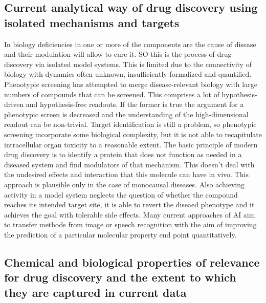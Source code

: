 	\subsection{Current analytical way of drug discovery using isolated mechanisms and targets}
	In biology deficiencies in one or more of the components are the cause of disease and their modulation will allow to cure it.
	SO this is the process of drug discovery via isolated model systems.
	This is limited due to the connectivity of biology with dynamics often unknown, insufficiently formalized and quantified.
	Phenotypic screening has attempted to merge disease-relevant biology with large numbers of compounds that can be screened.
	This comprises a lot of hypothesis-driven and hypothesis-free readouts.
	If the former is true the argument for a phenotypic screen is decreased and the understanding of the high-dimensional readout can be non-trivial.
	Target identification is still a problem, so phenotypic screening incorporate some biological complexity, but it is not able to recapitulate intracellular organ toxicity to a reasonable extent.
	The basic principle of modern drug discovery is to identify a protein that does not function as needed in a diseased system and find modulators of that mechanism.
	This doesn't deal with the undesired effects and interaction that this molecule can have in vivo.
	This approach is plausible only in the case of monocausal diseases.
	Also achieving activity in a model system neglects the question of whether the compound reaches its intended target site, it is able to revert the diseaed phenotype and it achieves the goal with tolerable side effects.
	Many current approaches of AI aim to transfer methods from image or speech recognition with the aim of improving the prediction of a particular molecular property end point quantitatively.

	\subsection{Chemical and biological properties of relevance for drug discovery and the extent to which they are captured in current data}

